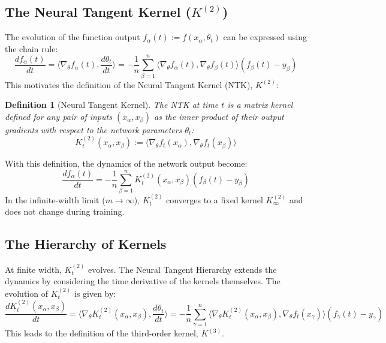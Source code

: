 \documentclass{article}
\newtheorem{definition}[theorem]{Definition}
\begin{document}
\subsection{The Neural Tangent Kernel ($K^{(2)}$)}
The evolution of the function output $f_\alpha(t) := f(x_\alpha, \theta_t)$ can be expressed using the chain rule:
\begin{equation}
\frac{d f_\alpha(t)}{dt} = \langle \nabla_\theta f_\alpha(t), \frac{d\theta_t}{dt} \rangle = -\frac{1}{n} \sum_{\beta=1}^n \langle \nabla_\theta f_\alpha(t), \nabla_\theta f_\beta(t) \rangle (f_\beta(t) - y_\beta)
\end{equation}
This motivates the definition of the Neural Tangent Kernel (NTK), $K^{(2)}$:
\begin{definition}[Neural Tangent Kernel]
The NTK at time $t$ is a matrix kernel defined for any pair of inputs $(x_\alpha, x_\beta)$ as the inner product of their output gradients with respect to the network parameters $\theta_t$:
\begin{equation}
K^{(2)}_t(x_\alpha, x_\beta) := \langle \nabla_\theta f_t(x_\alpha), \nabla_\theta f_t(x_\beta) \rangle
\end{equation}
\end{definition}
With this definition, the dynamics of the network output become:
\begin{equation}
\frac{d f_\alpha(t)}{dt} = -\frac{1}{n} \sum_{\beta=1}^n K^{(2)}_t(x_\alpha, x_\beta) (f_\beta(t) - y_\beta)
\end{equation}
In the infinite-width limit ($m \to \infty$), $K^{(2)}_t$ converges to a fixed kernel $K^{(2)}_\infty$ and does not change during training.

\subsection{The Hierarchy of Kernels}
At finite width, $K^{(2)}_t$ evolves. The Neural Tangent Hierarchy extends the dynamics by considering the time derivative of the kernels themselves. The evolution of $K^{(2)}_t$ is given by:
\begin{equation}
\frac{d K^{(2)}_t(x_\alpha, x_\beta)}{dt} = \langle \nabla_\theta K^{(2)}_t(x_\alpha, x_\beta), \frac{d\theta_t}{dt} \rangle = -\frac{1}{n} \sum_{\gamma=1}^n \langle \nabla_\theta K^{(2)}_t(x_\alpha, x_\beta), \nabla_\theta f_t(x_\gamma) \rangle (f_\gamma(t) - y_\gamma)
\end{equation}
This leads to the definition of the third-order kernel, $K^{(3)}$.
\end{document}
